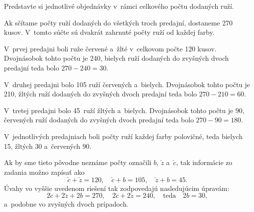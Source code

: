 {%
\napad
Predstavte si jednotlivé objednávky v~rámci celkového počtu dodaných ruží.

\riesenie
Ak sčítame počty ruží dodaných do všetkých troch predajní, dostaneme 270 kusov.
V~tomto súčte sú dvakrát zahrnuté počty ruží od každej farby.

V~prvej predajni boli ruže červené a~žlté v~celkovom počte 120 kusov.
Dvojnásobok tohto počtu je 240, bielych ruží dodaných do zvyšných dvoch predajní teda bolo $270-240=30$.

V~druhej predajni bolo 105 ruží červených a~bielych.
Dvojnásobok tohto počtu je 210, žltých ruží dodaných do zvyšných dvoch predajní teda bolo $270-210=60$.

V~tretej predajni bolo 45~ruží žltých a~bielych.
Dvojnásobok tohto počtu je 90, červených ruží dodaných do zvyšných dvoch predajní teda bolo $270-90=180$.

\poznamka
V~jednotlivých predajniach boli počty ruží každej farby polovičné, teda bielych 15, žltých 30 a~červených 90.

Ak by sme tieto pôvodne neznáme počty označili $b$, $\check{z}$ a~$\check{c}$, tak informácie zo zadania možno zapísať ako
$$
\check{c}+\check{z}=120,\quad
\check{c}+b=105,\quad
\check{z}+b=45.
$$
Úvahy vo vyššie uvedenom riešení tak zodpovedajú nasledujúcim úpravám:
$$
2\check{c}+2\check{z}+2b=270,\quad
2\check{c}+2\check{z}=240,
\quad\text{teda}\quad
2b=30,
$$
a~podobne vo zvyšných dvoch prípadoch.

}

